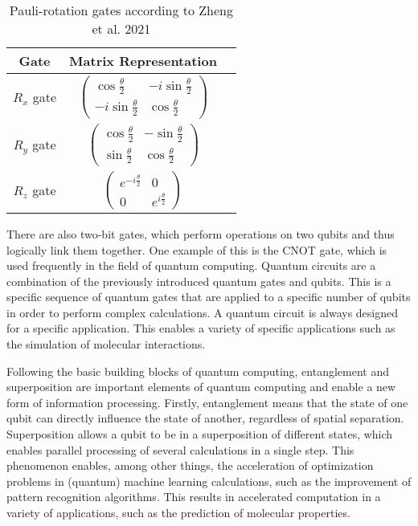\begin{table}[h!]
    \centering
    \captionsetup{justification=centering}
    \begin{tabular}{ccc}
    \hline
    \textbf{Gate} & \textbf{Matrix Representation} \\ 
    \hline
    $R_x$ gate & $\begin{pmatrix} \cos\frac{\theta}{2} & -i\sin\frac{\theta}{2} \\ -i\sin\frac{\theta}{2} & \cos\frac{\theta}{2} \end{pmatrix}$ \\ 
    $R_y$ gate & $\begin{pmatrix} \cos\frac{\theta}{2} & -\sin\frac{\theta}{2} \\ \sin\frac{\theta}{2} & \cos\frac{\theta}{2} \end{pmatrix}$ \\ 
    $R_z$ gate & $\begin{pmatrix} e^{-i\frac{\theta}{2}} & 0 \\ 0 & e^{i\frac{\theta}{2}} \end{pmatrix}$ \\ 
    \hline
    \end{tabular}
    \caption[Pauli-rotation gates according to Zheng et al. 2021]{\label{tab:pauligates} Pauli-rotation gates according to Zheng et al. 2021 \cite{zheng2021quantum}}
\end{table}

There are also two-bit gates, which perform operations on two qubits and thus logically link them together. One example of this is the CNOT gate, which is used frequently in the field of quantum computing. \cite{zheng2021quantum} Quantum circuits are a combination of the previously introduced quantum gates and qubits. This is a specific sequence of quantum gates that are applied to a specific number of qubits in order to perform complex calculations. A quantum circuit is always designed for a specific application. This enables a variety of specific applications such as the simulation of molecular interactions. \cite{claudino2022basics} 

Following the basic building blocks of quantum computing, entanglement and superposition are important elements of quantum computing and enable a new form of information processing. Firstly, entanglement means that the state of one qubit can directly influence the state of another, regardless of spatial separation. Superposition allows a qubit to be in a superposition of different states, which enables parallel processing of several calculations in a single step. This phenomenon enables, among other things, the acceleration of optimization problems in (quantum) machine learning calculations, such as the improvement of pattern recognition algorithms. This results in accelerated computation in a variety of applications, such as the prediction of molecular properties. \cite{dunjko2017machine} 

